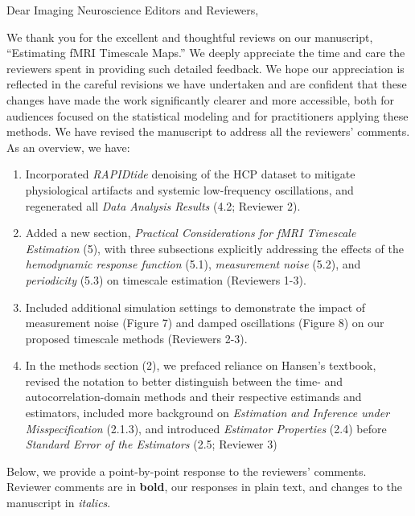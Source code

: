 \documentclass[docs/main.tex]{subfiles}
\begin{document}
Dear Imaging Neuroscience Editors and Reviewers,

\vspace{0.5cm}

We thank you for the excellent and thoughtful reviews on our manuscript, ``Estimating fMRI Timescale Maps.'' We deeply appreciate the time and care the reviewers spent in providing such detailed feedback. We hope our appreciation is reflected in the careful revisions we have undertaken and are confident that these changes have made the work significantly clearer and more accessible, both for audiences focused on the statistical modeling and for practitioners applying these methods. We have revised the manuscript to address all the reviewers' comments. As an overview, we have:

\begin{enumerate}
    \item Incorporated \textit{RAPIDtide} denoising of the HCP dataset to mitigate physiological artifacts and systemic low-frequency oscillations, and regenerated all \textit{Data Analysis Results }(4.2; Reviewer 2).
    \item Added a new section, \textit{Practical Considerations for fMRI Timescale Estimation} (5), with three subsections explicitly addressing the effects of the \textit{hemodynamic response function} (5.1), \textit{measurement noise} (5.2), and \textit{periodicity} (5.3) on timescale estimation (Reviewers 1-3). 
    \item Included additional simulation settings to demonstrate the impact of measurement noise (Figure 7) and damped oscillations (Figure 8) on our proposed timescale methods (Reviewers 2-3).
    \item In the methods section (2), we prefaced reliance on Hansen’s textbook, revised the notation to better distinguish between the time- and autocorrelation-domain methods and their respective estimands and estimators, included more background on \textit{Estimation and Inference under Misspecification} (2.1.3), and introduced \textit{Estimator Properties} (2.4) before \textit{Standard Error of the Estimators} (2.5; Reviewer 3)
\end{enumerate}

\vspace{0.5cm}

Below, we provide a point-by-point response to the reviewers’ comments. Reviewer comments are in \textbf{bold}, our responses in plain text, and changes to the manuscript in \textit{italics}.
\end{document}
